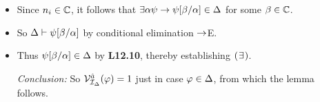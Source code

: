 \documentclass[a4paper, 11pt]{article} %
\begin{document}
\begin{itemize}
    \item Since $n_i\in\mathbb{C}$, it follows that $\exists \alpha\psi\rightarrow\psi[\beta/\alpha]\in\Delta$ for some $\beta\in\mathbb{C}$.
    \item So $\Delta\vdash\psi[\beta/\alpha]$ by conditional elimination $\rightarrow$E. 
    \item Thus $\psi[\beta/\alpha]\in\Delta$ by \textbf{L12.10}, thereby establishing $(\hspace{.7pt}\exists\hspace{.7pt})$.
  \item[\it Conclusion:] So $\mathcal{V}_{\mathcal{I}_{\Delta}}^{\hat{a}}(\varphi)=1$ just in case $\varphi\in\Delta$, from which the lemma follows.
\end{itemize}
\end{document}
